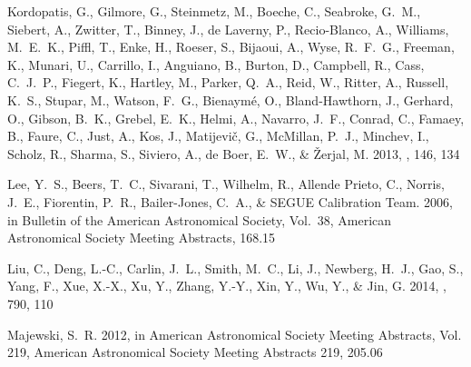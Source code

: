 \documentclass[12pt, preprint]{aastex}
\begin{document}
\begin{thebibliography}{23}
{Kordopatis}, G., {Gilmore}, G., {Steinmetz}, M., {Boeche}, C., {Seabroke},
  G.~M., {Siebert}, A., {Zwitter}, T., {Binney}, J., {de Laverny}, P.,
  {Recio-Blanco}, A., {Williams}, M.~E.~K., {Piffl}, T., {Enke}, H., {Roeser},
  S., {Bijaoui}, A., {Wyse}, R.~F.~G., {Freeman}, K., {Munari}, U., {Carrillo},
  I., {Anguiano}, B., {Burton}, D., {Campbell}, R., {Cass}, C.~J.~P.,
  {Fiegert}, K., {Hartley}, M., {Parker}, Q.~A., {Reid}, W., {Ritter}, A.,
  {Russell}, K.~S., {Stupar}, M., {Watson}, F.~G., {Bienaym{\'e}}, O.,
  {Bland-Hawthorn}, J., {Gerhard}, O., {Gibson}, B.~K., {Grebel}, E.~K.,
  {Helmi}, A., {Navarro}, J.~F., {Conrad}, C., {Famaey}, B., {Faure}, C.,
  {Just}, A., {Kos}, J., {Matijevi{\v c}}, G., {McMillan}, P.~J., {Minchev},
  I., {Scholz}, R., {Sharma}, S., {Siviero}, A., {de Boer}, E.~W., \& {{\v
  Z}erjal}, M. 2013, \aj, 146, 134

{Lee}, Y.~S., {Beers}, T.~C., {Sivarani}, T., {Wilhelm}, R., {Allende Prieto},
  C., {Norris}, J.~E., {Fiorentin}, P.~R., {Bailer-Jones}, C.~A., \& {SEGUE
  Calibration Team}. 2006, in Bulletin of the American Astronomical Society,
  Vol.~38, American Astronomical Society Meeting Abstracts, 168.15

{Liu}, C., {Deng}, L.-C., {Carlin}, J.~L., {Smith}, M.~C., {Li}, J., {Newberg},
  H.~J., {Gao}, S., {Yang}, F., {Xue}, X.-X., {Xu}, Y., {Zhang}, Y.-Y., {Xin},
  Y., {Wu}, Y., \& {Jin}, G. 2014, \apj, 790, 110

{Majewski}, S.~R. 2012, in American Astronomical Society Meeting Abstracts,
  Vol. 219, American Astronomical Society Meeting Abstracts 219, 205.06


\end{thebibliography}
\end{document}
